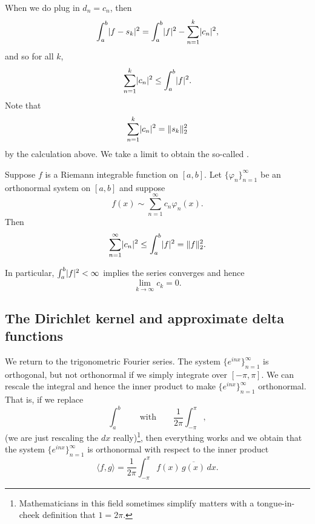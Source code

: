 When we do plug in $d_n = c_n$, then
\begin{equation*}
\int_a^b \lvert {f-s_k} \rvert^2
=
\int_a^b \lvert {f} \rvert^2
-
\sum_{n=1}^k \lvert {c_n} \rvert^2 ,
\end{equation*}
and so for all $k$,
\begin{equation*}
\sum_{n=1}^k \lvert {c_n} \rvert^2
\leq
\int_a^b \lvert {f} \rvert^2 .
\end{equation*}
Note that
\begin{equation*}
\sum_{n=1}^k \lvert {c_n} \rvert^2 = \lVert {s_k} \rVert_2^2
\end{equation*}
by the calculation above.
We take a limit to obtain the so-called
\emph{}.

\begin{thm} \label{thm:bessels}
Suppose $f$ is a Riemann integrable function on $[a,b]$.
Let $\{ \varphi_n \}_{n=1}^\infty$ be an orthonormal system on $[a,b]$ and
suppose
\begin{equation*}
f(x) \sim \sum_{n=1}^\infty c_n \varphi_n(x) .
\end{equation*}
Then
\begin{equation*}
\sum_{n=1}^\infty \lvert {c_n} \rvert^2
\leq
\int_a^b \lvert {f} \rvert^2
= \lVert {f} \rVert_2^2 .
\end{equation*}
\end{thm}

In particular, $\int_a^b \lvert {f} \rvert^2 < \infty$ implies the series
converges and hence
\begin{equation*}
\lim_{k \to \infty} c_k = 0 .
\end{equation*}

\subsection{The Dirichlet kernel and approximate delta functions}

We return to the trigonometric Fourier series.
The system $\{ e^{inx} \}_{n=1}^\infty$ is orthogonal, but not orthonormal if we simply
integrate over $[-\pi,\pi]$.  We can rescale the integral
and hence the inner product to make 
$\{ e^{inx} \}_{n=1}^\infty$ orthonormal.  That is, if we replace
\begin{equation*}
\int_a^b \qquad \text{with} \qquad
\frac{1}{2\pi} \int_{-\pi}^\pi,
\end{equation*}
(we are just rescaling the $dx$ really)\footnote{%
Mathematicians in this field sometimes simplify matters with
a tongue-in-cheek definition that $1=2\pi$.},
then everything works and we obtain that the system
$\{ e^{inx} \}_{n=1}^\infty$
is orthonormal with respect to the inner product
\begin{equation*}
\langle f , g \rangle =
\frac{1}{2\pi} \int_{-\pi}^\pi f(x) \, \overline{g(x)} \, dx .
\end{equation*}

